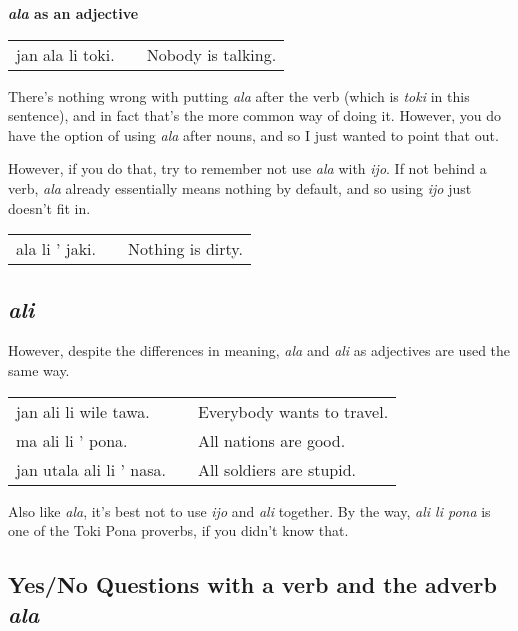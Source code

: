 \textbf{\textit{ala} as an adjective}

\begin{supertabular}{p{5,5cm}|ll}
jan ala li toki. && Nobody is talking. \\
\end{supertabular} 

There's nothing wrong with putting \textit{ala} after the verb (which is \textit{toki} in this sentence), and in fact that's the more common way of doing it. 
However, you do have the option of using \textit{ala} after nouns, and so I just wanted to point that out. 

However, if you do that, try to remember not use \textit{ala} with \textit{ijo}. 
If not behind a verb, \textit{ala} already essentially means nothing by default, and so using \textit{ijo} just doesn't fit in.

\begin{supertabular}{p{5,5cm}|ll}
ala li ' jaki. && Nothing is dirty. \\
\end{supertabular} 
%
\subsection*{\textit{ali}}
%
However, despite the differences in meaning, \textit{ala} and \textit{ali} as adjectives are used the same way.

\begin{supertabular}{p{5,5cm}|ll}
jan ali li wile tawa. && Everybody wants to travel. \\
ma ali li ' pona. && All nations are good. \\
jan utala ali li ' nasa. && All soldiers are stupid.
\end{supertabular} 

Also like \textit{ala}, it's best not to use \textit{ijo} and \textit{ali} together. 
By the way, \textit{ali li pona} is one of the Toki Pona proverbs, if you didn't know that.  
%
{}
\subsection*{Yes/No Questions with a verb and the adverb \textit{ala}}

